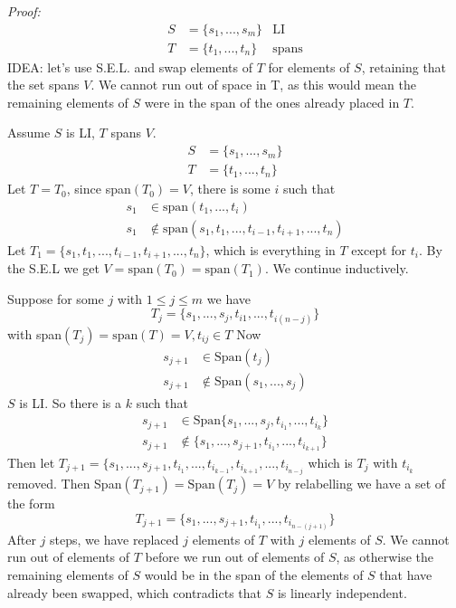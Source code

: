 \documentclass{report}
\theoremstyle{remark}
\theoremstyle{definition}
\theoremstyle{definition}
\theoremstyle{theorem}
\begin{document}
\emph{Proof:} 
\begin{align*}
    S &= \{s_1, ..., s_m\} & \text{LI}\\
    T &= \{t_1, ..., t_n \} & \text{spans}
\end{align*}
IDEA: let's use S.E.L. and swap elements of $T$ for elements of $S$, retaining that the set spans $V$. We cannot run out of space in T, as this would mean the remaining elements of $S$ were in the span of the ones already placed in $T$. \par Assume $S$ is LI, $T$ spans $V$.
\begin{align*}
    S &= \{s_1, ..., s_m\}\\
    T &= \{t_1, ..., t_n \}
\end{align*}
Let $T=T_0$, since span$(T_0) = V$, there is some $i$ such that
\begin{align*}
    s_1 &\in \text{span}(t_1, ..., t_i)\\
    s_1 & \notin \text{span}(s_1, t_1, ..., t_{i-1}, t_{i+1}, ..., t_n)
\end{align*}
Let $T_1 = \{s_1, t_1, ..., t_{i-1}, t_{i+1}, ..., t_n\}$, which is everything in $T$ except for $t_i$. By the S.E.L we get $V = \text{span}(T_0) = \text{span}(T_1)$. We continue inductively. \par
Suppose for some $j$ with $1 \leq j \leq m$ we have 
\[T_j = \{s_1, ..., s_j, t_{i1}, ..., t_{i(n-j)}\} \]
with span$(T_j) = \text{span}(T)=V, t_{ij} \in T$ Now 
\begin{align*}
    s_{j+1} &\in \text{Span}(t_j)\\
    s_{j+1} & \notin \text{Span}(s_1, ..., s_j)
\end{align*}
$S$ is LI. So there is a $k$ such that
\begin{align*}
    s_{j+1} &\in \text{Span}\{s_1, ..., s_j, t_{i_1}, ..., t_{i_k}\}\\
    s_{j+1} &\notin \{s_1, ..., s_{j+1}, t_{i_1}, ...,  t_{i_{k+1}}\}
\end{align*}
Then let $T_{j+1} = \{s_1, ..., s_{j+1}, t_{i_1}, ..., t_{i_{k-1}}, t_{i_{k+1}}, ..., t_{i_{n-j}}$ which is $T_j$ with $t_{i_k}$ removed. Then Span$(T_{j+1}) = \text{Span}(T_j) = V$ by relabelling we have a set of the form
\[T_{j+1} = \{s_1, ..., s_{j+1}, t_{i_1}, ..., t_{i_{n-(j+1)}}\} \]
After $j$ steps, we have replaced $j$ elements of $T$ with $j$ elements of $S$. We cannot run out of elements of $T$ before we run out of elements of $S$, as otherwise the remaining elements of $S$ would be in the span of the elements of $S$ that have already been swapped, which contradicts that $S$ is linearly independent.\par\par
\end{document}

